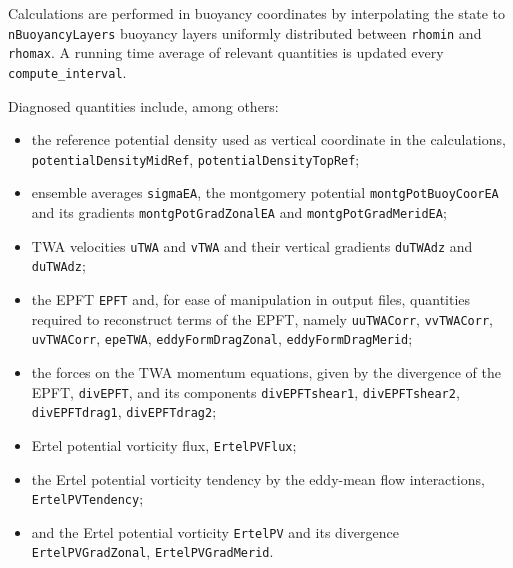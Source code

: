 Calculations are performed in buoyancy coordinates by interpolating the state to \verb+nBuoyancyLayers+ buoyancy layers uniformly distributed between \verb+rhomin+ and \verb+rhomax+. 
A running time average of relevant quantities is updated every \verb+compute_interval+.

Diagnosed quantities include, among others: 
\begin{itemize}
\item the reference potential density used as vertical coordinate in the calculations, \verb+potentialDensityMidRef+, \verb+potentialDensityTopRef+;
\item ensemble averages \verb+sigmaEA+, the montgomery potential \verb+montgPotBuoyCoorEA+ and its gradients \verb+montgPotGradZonalEA+ and \verb+montgPotGradMeridEA+; 
\item TWA velocities \verb+uTWA+ and \verb+vTWA+ and their vertical gradients \verb+duTWAdz+ and \verb+duTWAdz+; 
\item the EPFT \verb+EPFT+ and, for ease of manipulation in output files, quantities required to reconstruct terms of the EPFT, namely \verb+uuTWACorr+, \verb+vvTWACorr+, \verb+uvTWACorr+, \verb+epeTWA+, \verb+eddyFormDragZonal+, \verb+eddyFormDragMerid+;
\item the forces on the TWA momentum equations, given by the divergence of the EPFT, \verb+divEPFT+, and its components \verb+divEPFTshear1+, \verb+divEPFTshear2+, \verb+divEPFTdrag1+, \verb+divEPFTdrag2+;
\item Ertel potential vorticity flux, \verb+ErtelPVFlux+;
\item the Ertel potential vorticity tendency by the eddy-mean flow interactions, \verb+ErtelPVTendency+;
\item and the Ertel potential vorticity \verb+ErtelPV+ and its divergence \verb+ErtelPVGradZonal+, \verb+ErtelPVGradMerid+.
\end{itemize}